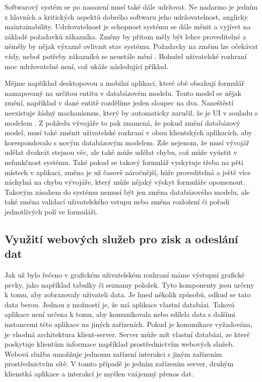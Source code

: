 Softwarový systém se po nasazení musí také dále udržovat. Ne nadarmo je jedním z hlavních a kritických aspektů dobrého softwaru jeho udržovatelnost, anglicky maintainability. Udržovatelnost je schopnost systému se dále měnit a vyjívet na základě požadavků zákazníka. Změny by přitom měly být lehce proveditelné a něměly by nějak výrazně ovlivnit stav systému. Požadavky na změnu lze očekávat vždy, neboť potřeby zákazníků se neustále mění \cite{sommerville}. Bohužel uživatelské rozhraní moc udržovatelné není, což ukáže následující příklad.

Mějme například desktopovou a mobilní aplikaci, které obě obsahují formulář namapovaný na určitou entitu v databázovém modelu. Tento model se nějak změní, například v dané entitě rozdělíme jeden sloupec na dva. Naneštěstí neexistuje žádný machanismus, který by automaticky zaručil, že je UI v souladu s modelem \cite{cernyTEA}. Z pohledu vývojáře to pak znamená, že pokud změní databázový model, musí také změnit uživatelské rozhraní v obou klientských aplikacích, aby korespondovalo s novým databázovým modelem. Zde nejenom, že musí vývojář udělat dvakrát stejnou věc, ale také může udělat chybu, což může vyústit v nefunkčnost systému. Také pokud se takový formulář vyskytuje třeba na pěti místech v aplikaci, změna je už časově náročnější, hůře proveditelná a ještě více náchylná na chybu vývojáře, který může nějaký výskyt formuláře opomenout.
Takovým zásahem do systému nemusí být jen změna databázového modelu, ale také změna validací uživatelského vstupu nebo změna rozložení či pořadí jednotlivých polí ve formuláři.

\subsection{Využití webových služeb pro zisk a odeslání dat}
Jak už bylo řečeno v grafickém uživatelském rozhraní máme výstupní grafické prvky, jako například tabulky či seznamy položek. Tyto komponenty jsou určeny k tomu, aby zobrazovaly uživateli data. Je hned několik způsobů, odkud se tato data berou. Jednou z možností je, že má aplikace vlastní databázi. Taková aplikace není určena k tomu, aby komunikovala nebo sdílela data s dalšími instancemi této aplikace na jiných zařízeních. Pokud je komunikace vyžadována, je vhodná architektura klient-server. Server může mít vlastní databázi, ze které poskytuje klientům informace například prostřednictvím webových služeb. Webová služba umožňuje jednomu zařízení interakci s jiným zařízením prostřednictvím sítě\cite{wiki-ws}. V tomto případě je jedním zařízením server, druhým klienstká aplikace a interakcí je myšlen vzájemný přenos dat. 

